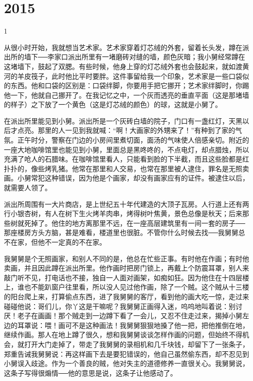 \chapter{2015}

1 

从很小时开始，我就想当艺术家。艺术家穿着灯芯绒的外套，留着长头发，蹲在派出所的墙下──李家口派出所里有一堵磨砖对缝的墙，颜色灰暗；我小舅经常蹲在这堵墙下，鼓起了双腮。有些时候，他身上穿的灯芯绒外套也会鼓起来，就如渡黄河的羊皮筏子，此时他比平时要胖。这件事留给我一个印象，艺术家是一些口袋似的东西。他和口袋的区别是：口袋绊脚，你要用手把它挪开；艺术家绊脚时，你踢他一下，他就自己挪开了。在我记忆之中，一个灰而透亮的垂直平面（这是那堵墙的样子）之下放了一个黄色（这是灯芯绒的颜色）的球，这就是小舅了。 

在派出所里能见到小舅。派出所是一个灰砖白墙的院子，门口有一盏红灯，天黑以后才点亮。那里的人一见到我就喊：“啊！大画家的外甥来了！”有种到了家的气氛。正午时分，警察在门边的小房间里煮切面，面汤的气味使人倍感亲切。附近的一座大地咖啡馆里也能见到小舅，里面总是黑咚咚的，不点电灯，却点腊烛，所以充满了呛人的石腊味。在咖啡馆里看人，只能看到脸的下半截，而且这些脸都是红扑扑的，像些烤乳猪。他常在那里和人交易，也常在那里被人逮住，罪名是无照卖画。小舅常犯这种错误，因为他是个画家，却没有画家应有的证件。被逮住以后，就需要人领了。 

派出所周围有一大片商店，是上世纪五十年代建造的大顶子瓦房。人行道上还有两行小银杏树，有人在树下生火烤羊肉串，烤得树叶焦黄，景色总像是秋天；后来那些树就死掉了。他住的地方离那里不远，在一座高层建筑里有一间一套的房子──那座楼房方头方脑，甚是难看，楼道里也很脏。不管你什么时候去找──我舅舅总不在家，但他不一定真的不在家。 

我舅舅是个无照画家，和别人不同的是，他总在忙些正事。有时他在作画；有时他卖画，并且因此蹲在派出所里。他作画时把房门锁上，再戴上个防震耳罩，别人来敲门听不见，打电话也不接，独自一人面对画架，如痴如狂。因为他住在十四层楼上，谁也不能趴窗户往里看，所以没人见过他作画，除了一个贼。这个贼从十三楼的阳台爬上来，打算偷点东西，进了我舅舅的客厅，看到他的画大吃一惊，走过来碰碰他说：哥们儿，你丫这是干嘛呢？我舅舅正画得入迷，呜呜地叫着说：别讨厌！老子在画画！那个贼走到一边蹲下看了一会儿，又忍不住走过来，揭掉小舅左边的耳罩说：喂！画可不是这种画法！我舅舅狠狠地搡了他一把，把他推倒在地，继续作画。那人在地上蹲了很久，想和我舅舅谈谈怎样作画的问题，但始终不得机会，就打开大门走掉了，带走了我舅舅的录相机和几千块钱，却留下了一张条子，郑重告诫我舅舅说：再这样画下去是要犯错误的，他自己虽然偷东西，却不忍见到小舅误入歧途。作为一个善良的贼，他对失主的道德修养一直很关心。我舅舅说，这条子写得很煽情──他的意思是说，这条子让他感动了。 


